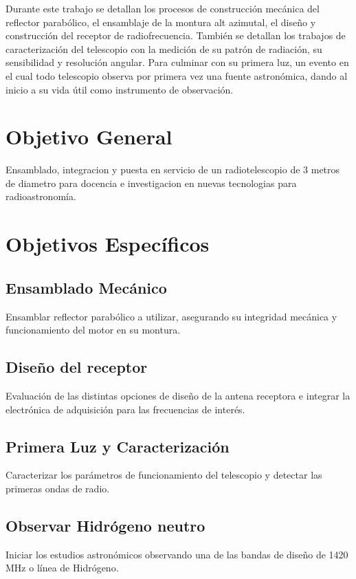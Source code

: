 Durante este trabajo se detallan los procesos de construcción mecánica del reflector parabólico, el ensamblaje de la montura alt azimutal, el diseño y construcción del receptor de radiofrecuencia. También se detallan los trabajos de caracterización del telescopio con la medición de su patrón de radiación, su sensibilidad y resolución angular. Para culminar con su primera luz, un evento en el cual todo telescopio observa por primera vez una fuente astronómica, dando al inicio a su vida útil como instrumento de observación.\\


\section{Objetivo General}
Ensamblado, integracion y puesta en servicio de un radiotelescopio de 3 metros de diametro para docencia e investigacion en nuevas tecnologias para radioastronomía.

\section{Objetivos Específicos}
\subsection{Ensamblado Mecánico}

Ensamblar reflector parabólico a utilizar, asegurando su integridad mecánica y funcionamiento del motor en su montura.

\subsection{Diseño del receptor}

Evaluación de las distintas opciones de diseño de la antena receptora e integrar la electrónica de adquisición para las frecuencias de interés.

\subsection{Primera Luz y Caracterización}

Caracterizar los parámetros de funcionamiento del telescopio y detectar las primeras ondas de radio.

\subsection{Observar Hidrógeno neutro}


Iniciar los estudios astronómicos observando una de las bandas de diseño de 1420 MHz o línea de Hidrógeno.